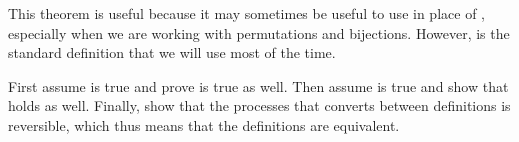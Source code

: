 This theorem is useful because it may sometimes be useful to use  in place of , especially when we are working with permutations and bijections. However,  is the standard definition that we will use most of the time.

\begin{proofsketch}
    First assume  is true and prove  is true as well. Then assume  is true and show that  holds as well. Finally, show that the processes that converts between definitions is reversible, which thus means that the definitions are equivalent.
\end{proofsketch}

